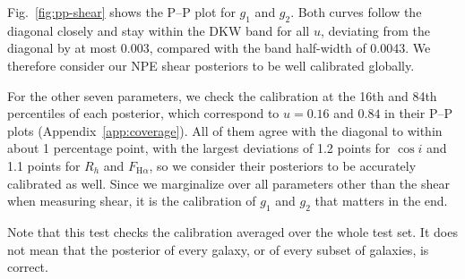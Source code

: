 Fig.~\ref{fig:pp-shear} shows the P--P plot for $g_1$ and $g_2$. Both curves follow the diagonal closely and stay within the DKW band for all $u$, deviating from the diagonal by at most 0.003, compared with the band half-width of 0.0043. We therefore consider our NPE shear posteriors to be well calibrated globally.

For the other seven parameters, we check the calibration at the 16th and 84th percentiles of each posterior, which correspond to $u = 0.16$ and $0.84$ in their P--P plots (Appendix~\ref{app:coverage}). All of them agree with the diagonal to within about 1 percentage point, with the largest deviations of 1.2 points for $\cos i$ and 1.1 points for $R_h$ and $F_{\mathrm{H}\alpha}$, so we consider their posteriors to be accurately calibrated as well. Since we marginalize over all parameters other than the shear when measuring shear, it is the calibration of $g_1$ and $g_2$ that matters in the end.

Note that this test checks the calibration averaged over the whole test set. It does not mean that the posterior of every galaxy, or of every subset of galaxies, is correct.
